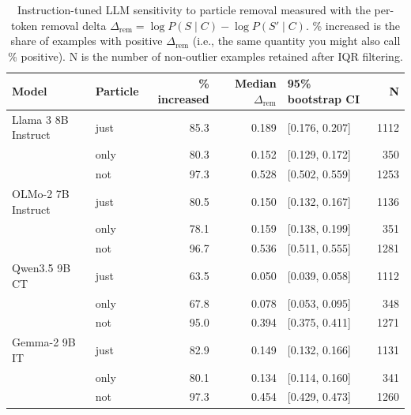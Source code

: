 \begin{table}[t]
\centering
\small
\begin{tabular}{llrrlr}
\toprule
Model & Particle & \% increased & Median $\Delta_{\mathrm{rem}}$ & 95\% bootstrap CI & N \\
\midrule
Llama 3 8B Instruct & just & 85.3 & 0.189 & [0.176, 0.207] & 1112 \\
 & only & 80.3 & 0.152 & [0.129, 0.172] & 350 \\
 & not & 97.3 & 0.528 & [0.502, 0.559] & 1253 \\
OLMo-2 7B Instruct & just & 80.5 & 0.150 & [0.132, 0.167] & 1136 \\
 & only & 78.1 & 0.159 & [0.138, 0.199] & 351 \\
 & not & 96.7 & 0.536 & [0.511, 0.555] & 1281 \\
Qwen3.5 9B CT & just & 63.5 & 0.050 & [0.039, 0.058] & 1112 \\
 & only & 67.8 & 0.078 & [0.053, 0.095] & 348 \\
 & not & 95.0 & 0.394 & [0.375, 0.411] & 1271 \\
Gemma-2 9B IT & just & 82.9 & 0.149 & [0.132, 0.166] & 1131 \\
 & only & 80.1 & 0.134 & [0.114, 0.160] & 341 \\
 & not & 97.3 & 0.454 & [0.429, 0.473] & 1260 \\
\bottomrule
\end{tabular}
\caption{Instruction-tuned LLM sensitivity to particle removal measured with the per-token removal delta $\Delta_{\mathrm{rem}} = \log P(S \mid C) - \log P(S' \mid C)$. \% increased is the share of examples with positive $\Delta_{\mathrm{rem}}$ (i.e., the same quantity you might also call \% positive). N is the number of non-outlier examples retained after IQR filtering. }
\label{tab:particle-removal-sensitivity}
\end{table}

